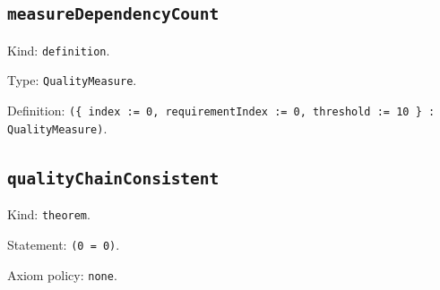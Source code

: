 \documentclass[11pt]{article}
\begin{document}
\subsection*{\texttt{measureDependencyCount}}
\noindent Kind: \texttt{definition}.\par
\noindent Type: \texttt{QualityMeasure}.\par
\noindent Definition: \texttt{(\{ index := 0, requirementIndex := 0, threshold := 10 \} : QualityMeasure)}.\par
\subsection*{\texttt{qualityChainConsistent}}
\noindent Kind: \texttt{theorem}.\par
\noindent Statement: \texttt{(0 = 0)}.\par
\noindent Axiom policy: \texttt{none}.\par
\end{document}

